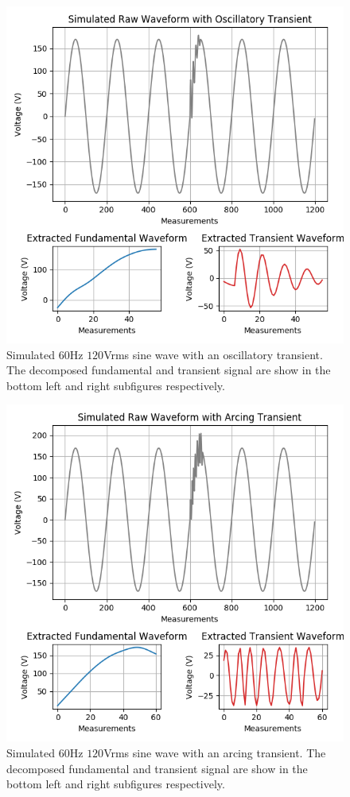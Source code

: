 \documentclass[10pt,conference,compsocconf]{IEEEtran}
\begin{document}
\begin{figure}[htbp]
\centering%
\includegraphics[scale=0.35]{./figures/oscillatory_sim.png}
\caption{Simulated $60$Hz $120$Vrms sine wave with an oscillatory transient. The decomposed fundamental and transient signal are show in the bottom left and right subfigures respectively.}\label{fig:OscillatorySim}
\end{figure}

\begin{figure}[htbp]
\centering%
\includegraphics[scale=0.35]{./figures/arcing_sim.png}
\caption{Simulated $60$Hz $120$Vrms sine wave with an arcing transient. The decomposed fundamental and transient signal are show in the bottom left and right subfigures respectively.}\label{fig:ArcingSim}
\end{figure}
\end{document}
